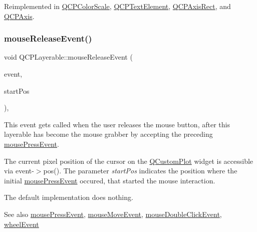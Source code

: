 Reimplemented in \hyperlink{class_q_c_p_color_scale_a91f633b97ffcd57fdf8cd814974c20e6}{Q\+C\+P\+Color\+Scale}, \hyperlink{class_q_c_p_text_element_ad7b2c98355e3d2f912574b74fcee0574}{Q\+C\+P\+Text\+Element}, \hyperlink{class_q_c_p_axis_rect_aa9a7c807eaa4666870ac94aa6abc4dde}{Q\+C\+P\+Axis\+Rect}, and \hyperlink{class_q_c_p_axis_ac89c068873ee9197a5d2af715bdc1105}{Q\+C\+P\+Axis}.

\mbox{\label{class_q_c_p_layerable_aa0d79b005686f668622bbe66ac03ba2c}} 
\subsubsection{\texorpdfstring{mouse\+Release\+Event()}{mouseReleaseEvent()}}
{\footnotesize\ttfamily void Q\+C\+P\+Layerable\+::mouse\+Release\+Event (\begin{DoxyParamCaption}\item[{Q\+Mouse\+Event $\ast$}]{event,  }\item[{const Q\+PointF \&}]{start\+Pos }\end{DoxyParamCaption})\hspace{0.3cm}{\ttfamily [protected]}, {\ttfamily [virtual]}}

This event gets called when the user releases the mouse button, after this layerable has become the mouse grabber by accepting the preceding \hyperlink{class_q_c_p_layerable_af6567604818db90f4fd52822f8bc8376}{mouse\+Press\+Event}.

The current pixel position of the cursor on the \hyperlink{class_q_custom_plot}{Q\+Custom\+Plot} widget is accessible via {\ttfamily event-\/$>$pos()}. The parameter {\itshape start\+Pos} indicates the position where the initial \hyperlink{class_q_c_p_layerable_af6567604818db90f4fd52822f8bc8376}{mouse\+Press\+Event} occured, that started the mouse interaction.

The default implementation does nothing.

\begin{DoxySeeAlso}{See also}
\hyperlink{class_q_c_p_layerable_af6567604818db90f4fd52822f8bc8376}{mouse\+Press\+Event}, \hyperlink{class_q_c_p_layerable_a9eee1ba47fd69be111059ca3881933e4}{mouse\+Move\+Event}, \hyperlink{class_q_c_p_layerable_a4171e2e823aca242dd0279f00ed2de81}{mouse\+Double\+Click\+Event}, \hyperlink{class_q_c_p_layerable_a47dfd7b8fd99c08ca54e09c362b6f022}{wheel\+Event} 
\end{DoxySeeAlso}


